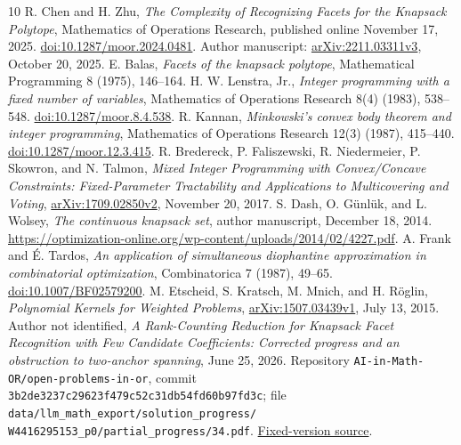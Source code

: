 \documentclass[11pt]{article}
\begin{document}
\begin{thebibliography}{10}\small
{} R. Chen and H. Zhu, \emph{The Complexity of Recognizing Facets for the Knapsack Polytope}, Mathematics of Operations Research, published online November 17, 2025. \href{https://doi.org/10.1287/moor.2024.0481}{doi:10.1287/moor.2024.0481}. Author manuscript: \href{https://arxiv.org/abs/2211.03311v3}{arXiv:2211.03311v3}, October 20, 2025.
 E. Balas, \emph{Facets of the knapsack polytope}, Mathematical Programming 8 (1975), 146--164.
 H. W. Lenstra, Jr., \emph{Integer programming with a fixed number of variables}, Mathematics of Operations Research 8(4) (1983), 538--548. \href{https://doi.org/10.1287/moor.8.4.538}{doi:10.1287/moor.8.4.538}.
 R. Kannan, \emph{Minkowski's convex body theorem and integer programming}, Mathematics of Operations Research 12(3) (1987), 415--440. \href{https://doi.org/10.1287/moor.12.3.415}{doi:10.1287/moor.12.3.415}.
 R. Bredereck, P. Faliszewski, R. Niedermeier, P. Skowron, and N. Talmon, \emph{Mixed Integer Programming with Convex/Concave Constraints: Fixed-Parameter Tractability and Applications to Multicovering and Voting}, \href{https://arxiv.org/abs/1709.02850v2}{arXiv:1709.02850v2}, November 20, 2017.
 S. Dash, O. G\"unl\"uk, and L. Wolsey, \emph{The continuous knapsack set}, author manuscript, December 18, 2014. \url{https://optimization-online.org/wp-content/uploads/2014/02/4227.pdf}.
 A. Frank and \'E. Tardos, \emph{An application of simultaneous diophantine approximation in combinatorial optimization}, Combinatorica 7 (1987), 49--65. \href{https://doi.org/10.1007/BF02579200}{doi:10.1007/BF02579200}.
 M. Etscheid, S. Kratsch, M. Mnich, and H. R\"oglin, \emph{Polynomial Kernels for Weighted Problems}, \href{https://arxiv.org/abs/1507.03439v1}{arXiv:1507.03439v1}, July 13, 2015.
 Author not identified, \emph{A Rank-Counting Reduction for Knapsack Facet Recognition with Few Candidate Coefficients: Corrected progress and an obstruction to two-anchor spanning}, June 25, 2026. Repository \texttt{AI-in-Math-OR/open-problems-in-or}, commit \texttt{3b2de3237c29623f479c52c31db54fd60b97fd3c}; file \texttt{data/llm\_math\_export/solution\_progress/}\\\texttt{W4416295153\_p0/partial\_progress/34.pdf}. \href{https://github.com/AI-in-Math-OR/open-problems-in-or/blob/3b2de3237c29623f479c52c31db54fd60b97fd3c/data/llm_math_export/solution_progress/W4416295153_p0/partial_progress/34.pdf}{Fixed-version source}.
\end{thebibliography}
\end{document}
